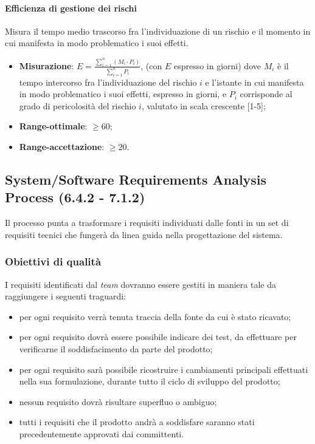 \paragraph{Efficienza di gestione dei rischi}
Misura il tempo medio trascorso fra l'individuazione di un rischio e il momento in cui manifesta in modo problematico i suoi effetti.
\begin{itemize}
\item \textbf{Misurazione}: $E = \frac{\sum_{i=1}^{n} (M_{i} \cdot P_{i})}{\sum_{i=1}^{n} P_{i}}$, (con $E$ espresso in giorni) dove $M_{i}$ è il tempo intercorso fra l'individuazione del rischio $i$ e l'istante in cui manifesta in modo problematico i suoi effetti, espresso in giorni, e $P_{i}$ corrisponde al grado di pericolosità del rischio $i$, valutato in scala crescente [1-5];
\item \textbf{Range-ottimale}: $\geq 60$;
\item \textbf{Range-accettazione}: $\geq 20$.
\end{itemize}

\subsection{System/Software Requirements Analysis Process (6.4.2 - 7.1.2)}
Il processo punta a trasformare i requisiti individuati dalle fonti in un set di requisiti tecnici che fungerà da linea guida nella progettazione del sistema.
\subsubsection{Obiettivi di qualità}
I requisiti identificati dal \textit{team} dovranno essere gestiti in maniera tale da raggiungere i seguenti traguardi:
\begin{itemize}
\item per ogni requisito verrà tenuta traccia della fonte da cui è stato ricavato;
\item per ogni requisito dovrà essere possibile indicare dei test, da effettuare per verificarne il soddisfacimento da parte del prodotto;
\item per ogni requisito sarà possibile ricostruire i cambiamenti principali effettuati nella sua formulazione, durante tutto il ciclo di sviluppo del prodotto;
\item nessun requisito dovrà risultare superfluo o ambiguo;
\item tutti i requisiti che il prodotto andrà a soddisfare saranno stati precedentemente approvati dai committenti.
\end{itemize}
